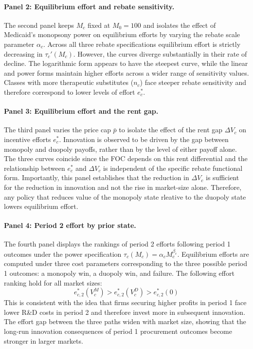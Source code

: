 \documentclass[12pt]{article}
\begin{document}
\paragraph{Panel 2: Equilibrium effort and rebate sensitivity.}
The second panel keeps $M_c$ fixed at $M_0 = 100$ and isolates the effect of Medicaid's monopsony power on equilibrium efforts by varying the rebate scale parameter $\alpha_c$. Across all three rebate specifications equilibrium effort is strictly decreasing in $\tau_c'(M_c)$. However, the curves diverge substantially in their rate of decline. The logarithmic form appears to have the steepest curve, while the linear and power forms maintain higher efforts across a wider range of sensitivity values. Classes with more therapeutic substitutes ($n_c$) face steeper rebate sensitivity and therefore correspond to lower levels of effort $e_c^*$.

\paragraph{Panel 3: Equilibrium effort and the rent gap.}
The third panel varies the price cap $\bar{p}$ to isolate the effect of the rent gap $\Delta V_c$ on incentive efforts $e_c^*$. Innovation is observed to be driven by the gap between monopoly and duopoly payoffs, rather than by the level of either payoff alone. The three curves coincide since the FOC depends on this rent differential and the relationship between $e_c^*$ and $\Delta V_c$ is independent of the specific rebate functional form. Importantly, this panel establishes that the reduction in $\Delta V_c$ is sufficient for the reduction in innovation and not the rise in market-size alone. Therefore, any policy that reduces value of the monopoly state rleative to the duopoly state lowers equilibrium effort.

\paragraph{Panel 4: Period 2 effort by prior state.}
The fourth panel displays the rankings of period 2 efforts following period 1 outcomes under the power specification $\tau_c(M_c)=\alpha_c M_c^{\beta_c}$. Equilibrium efforts are computed under three cost parameters corresponding to the three possible period 1 outcomes: a monopoly win, a duopoly win, and failure. The following effort ranking hold for all market sizes:
\[
e_{c,2}^*(V_c^M) > e_{c,2}^*(V_c^D) > e_{c,2}^*(0)
\]
This is consistent with the idea that firms securing higher profits in period 1 face lower R\&D costs in period 2 and therefore invest more in subsequent innovation. The effort gap between the three paths widen with market size, showing that the long-run innovation consequences of period 1 procurement outcomes become stronger in larger markets.
\end{document}
